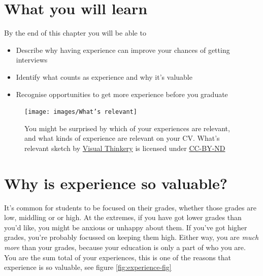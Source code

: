 \documentclass[
]{book}
\providecommand{\tightlist}{%
  \setlength{\itemsep}{0pt}\setlength{\parskip}{0pt}}
\begin{document}
\hypertarget{ilo5}{%
\section{What you will learn}\label{ilo5}}

By the end of this chapter you will be able to

\begin{itemize}
\tightlist
\item
  Describe why having experience can improve your chances of getting interviews
\item
  Identify what counts as experience and why it's valuable
\item
  Recognise opportunities to get more experience before you graduate
\end{itemize}

\begin{figure}

{\centering \texttt{[image: images/What's relevant]} 

}

\caption{You might be surprised by which of your experiences are relevant, and what kinds of experience are relevant on your CV. What's relevant sketch by \href{https://visualthinkery.com/}{Visual Thinkery} is licensed under \href{https://creativecommons.org/licenses/by-nd/4.0/}{CC-BY-ND}}\label{fig:relevance-fig}
\end{figure}



\hypertarget{why-is-experience-so-valuable}{%
\section{Why is experience so valuable?}\label{why-is-experience-so-valuable}}

It's common for students to be focused on their grades, whether those grades are low, middling or or high. At the extremes, if you have got lower grades than you'd like, you might be anxious or unhappy about them. If you've got higher grades, you're probably focussed on keeping them high. Either way, you are \emph{much more} than your grades, because your education is only a part of who you are. You are the sum total of your experiences, this is one of the reasons that experience is so valuable, see figure \ref{fig:experience-fig}
\end{document}

